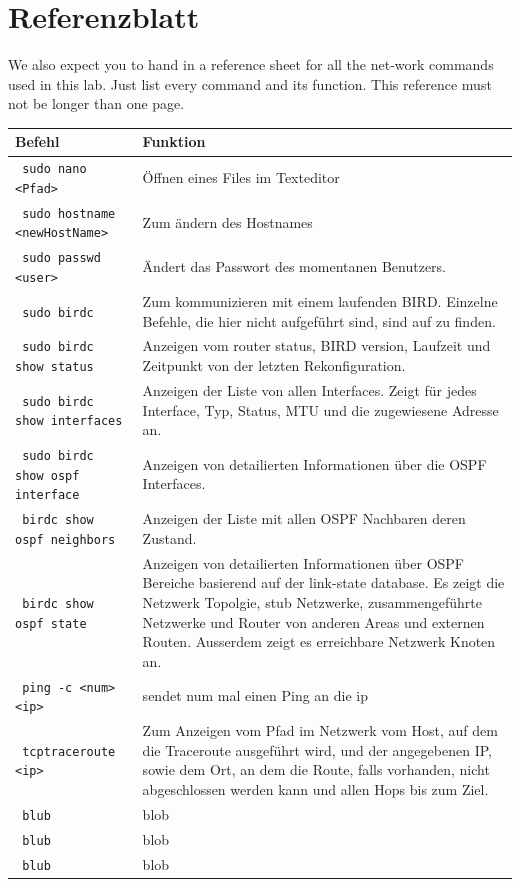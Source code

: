 \documentclass[11pt,titlepage]{article}
\newenvironment{shadedquotation}
 {\begin{shaded*}
  \quoting[leftmargin=0pt, vskip=0pt]
 }
 {\endquoting
 \end{shaded*}
}
\begin{document}
\section{Referenzblatt}
\label{sec:Referenzblatt}
\begin{shadedquotation}
  We also expect you to hand in a reference sheet for all the net-work commands used in this lab. Just list every command and its function. This reference must not be longer than one page.
\end{shadedquotation}

\par\medskip 

\begin{tabular}{ |p{4cm}|p{10cm}|}
  \hline
  \textbf{Befehl} & \textbf{Funktion} \\
  \hline
  \lstinline! sudo nano <Pfad> ! & Öffnen eines Files im Texteditor \\
  \hline
  \lstinline! sudo hostname <newHostName>! & Zum ändern des Hostnames \\
  \hline
  \lstinline! sudo passwd <user> ! & Ändert das Passwort des momentanen Benutzers. \\
  \hline
  \lstinline! sudo birdc ! & Zum kommunizieren mit einem laufenden BIRD. Einzelne Befehle, die hier nicht aufgeführt sind, sind auf \cite{BIRD_COMMAND} zu finden. \\
  \hline
  \lstinline! sudo birdc show status ! & Anzeigen vom router status, BIRD version, Laufzeit und Zeitpunkt von der letzten Rekonfiguration. \\
  \hline
  \lstinline! sudo birdc show interfaces ! & Anzeigen der Liste von allen Interfaces. Zeigt für jedes Interface, Typ, Status, MTU und die zugewiesene Adresse an.\\
  \hline
  \lstinline! sudo birdc show ospf interface ! & Anzeigen von detailierten Informationen über die OSPF Interfaces. \\
  \hline
  \lstinline! birdc show ospf neighbors ! & Anzeigen der Liste mit allen OSPF Nachbaren deren Zustand. \\
  \hline
  \lstinline! birdc show ospf state ! & Anzeigen von detailierten Informationen über OSPF Bereiche basierend auf der link-state database. Es zeigt die Netzwerk Topolgie, stub Netzwerke, zusammengeführte Netzwerke und Router von anderen Areas und externen Routen. Ausserdem zeigt es erreichbare Netzwerk Knoten an. \\
  \hline
  \lstinline! ping -c <num> <ip> ! & sendet num mal einen Ping an  die ip \\
  \hline
  \lstinline! tcptraceroute <ip> ! & Zum Anzeigen vom Pfad im Netzwerk vom Host, auf dem die Traceroute ausgeführt wird, und der angegebenen IP, sowie dem Ort, an dem die Route, falls vorhanden, nicht abgeschlossen werden kann und allen Hops bis zum Ziel. \\
  \hline
  \lstinline! blub ! & blob \\
  \hline
  \lstinline! blub ! & blob \\
  \hline
  \lstinline! blub ! & blob \\
  \hline
\end{tabular}
\end{document}
